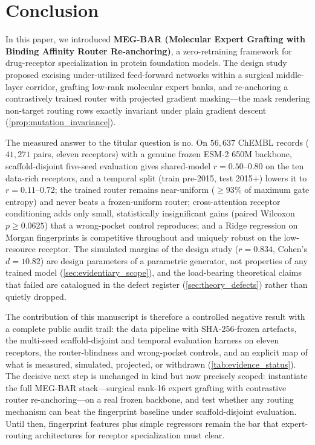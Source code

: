 \documentclass{article}
\theoremstyle{definition}
\begin{document}
\section{Conclusion}
\label{sec:conclusion}

In this paper, we introduced \textbf{MEG-BAR (Molecular Expert Grafting with Binding Affinity Router Re-anchoring)}, a zero-retraining framework for drug-receptor specialization in protein foundation models. The design study proposed excising under-utilized feed-forward networks within a surgical middle-layer corridor, grafting low-rank molecular expert banks, and re-anchoring a contrastively trained router with projected gradient masking---the mask rendering non-target routing rows exactly invariant under plain gradient descent (\cref{prop:mutation_invariance}).

The measured answer to the titular question is no. On $56{,}637$ ChEMBL records ($41{,}271$ pairs, eleven receptors) with a genuine frozen ESM-2 650M backbone, scaffold-disjoint five-seed evaluation gives shared-model $r = 0.50$--$0.80$ on the ten data-rich receptors, and a temporal split (train pre-2015, test 2015+) lowers it to $r = 0.11$--$0.72$; the trained router remains near-uniform ($\ge 93\%$ of maximum gate entropy) and never beats a frozen-uniform router; cross-attention receptor conditioning adds only small, statistically insignificant gains (paired Wilcoxon $p \ge 0.0625$) that a wrong-pocket control reproduces; and a Ridge regression on Morgan fingerprints is competitive throughout and uniquely robust on the low-resource receptor. The simulated margins of the design study ($r = 0.834$, Cohen's $d = 10.82$) are design parameters of a parametric generator, not properties of any trained model (\cref{sec:evidentiary_scope}), and the load-bearing theoretical claims that failed are catalogued in the defect register (\cref{sec:theory_defects}) rather than quietly dropped.

The contribution of this manuscript is therefore a controlled negative result with a complete public audit trail: the data pipeline with SHA-256-frozen artefacts, the multi-seed scaffold-disjoint and temporal evaluation harness on eleven receptors, the router-blindness and wrong-pocket controls, and an explicit map of what is measured, simulated, projected, or withdrawn (\cref{tab:evidence_status}). The decisive next step is unchanged in kind but now precisely scoped: instantiate the full MEG-BAR stack---surgical rank-16 expert grafting with contrastive router re-anchoring---on a real frozen backbone, and test whether any routing mechanism can beat the fingerprint baseline under scaffold-disjoint evaluation. Until then, fingerprint features plus simple regressors remain the bar that expert-routing architectures for receptor specialization must clear.
\end{document}
